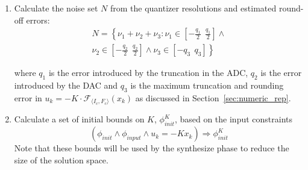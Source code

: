 \documentclass[twocolumn]{autart}    %
\newcommand{\mat}[1]{\boldsymbol{#1}}
\begin{document}
\begin{enumerate}
\begin{enumerate}

\item Calculate the noise set $N$ from the quantizer resolutions and estimated round-off errors: %
%
\begin{equation}
\nonumber
\begin{split}
N=\left \{ \nu_1+\nu_2+ \nu_3 : \nu_1 \in \left[-\frac{q_1}{2}\ \ \frac{q_1}{2}\right] 
\wedge \right. \\ \left. \nu_2 \in \left[-\frac{q_2}{2}\ \ \frac{q_2}{2}\right]  \wedge  \nu_3 \in \left[-q_3\ \ q_3\right]  \right \}
\end{split}
\end{equation}

%
where  $q_1$ is the error introduced by the truncation in the ADC, $q_2$ is
the error introduced by the DAC and $q_3$ is the maximum truncation and
rounding error in $u_k=-K \cdot \mathcal{F}_{\langle I_c,F_c \rangle}(x_k)$ as
discussed in Section~\ref{sec:numeric_rep}. %

\item Calculate a set of initial bounds on $K$, $\phi_\mathit{init}^{K}$,
based on the input constraints %
%
$$(\phi_\mathit{init} \wedge \phi_\mathit{input} \wedge u_k=-K x_k)
\Rightarrow \phi_\mathit{init}^{K}$$
Note that these bounds will be used by the {\sc synthesize} phase to reduce the size of the solution space. 


\end{enumerate}
\end{enumerate}
\end{document}
